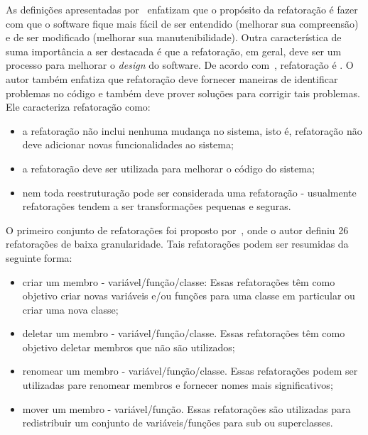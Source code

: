 As definições apresentadas por~ enfatizam que o propósito da refatoração é fazer com que o software fique mais fácil de ser entendido (melhorar sua compreensão) e de ser modificado (melhorar sua manutenibilidade). Outra característica de suma importância a ser destacada é que a refatoração, em geral, deve ser um processo para melhorar o \textit{design} do software. De acordo com~, refatoração é . O autor também enfatiza que refatoração deve fornecer maneiras de identificar problemas no código e também deve prover soluções para corrigir tais problemas. Ele caracteriza refatoração como:

\begin{itemize}
	\item a refatoração não inclui nenhuma mudança no sistema, isto é, refatoração não deve adicionar novas funcionalidades ao sistema;
	\item a refatoração deve ser utilizada para melhorar o código do sistema;
	\item nem toda reestruturação pode ser considerada uma refatoração - usualmente refatorações tendem a ser transformações pequenas e seguras. 
\end{itemize}

O primeiro conjunto de refatorações foi proposto por~, onde o autor definiu 26 refatorações de baixa granularidade. Tais refatorações podem ser resumidas da seguinte forma:

\begin{itemize}
	\item criar um membro  - variável/função/classe: Essas refatorações têm como objetivo criar novas variáveis e/ou funções para uma classe em particular ou criar uma nova classe;
	\item deletar um membro - variável/função/classe. Essas refatorações têm como objetivo deletar membros que não são utilizados;
	\item renomear um membro - variável/função/classe. Essas refatorações podem ser utilizadas pare renomear membros e fornecer nomes mais significativos;
	\item mover um membro - variável/função. Essas refatorações são utilizadas para redistribuir um conjunto de variáveis/funções para sub ou superclasses.
\end{itemize}

